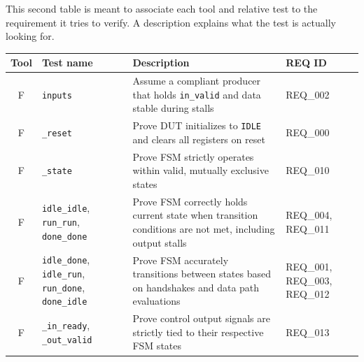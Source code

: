 This second table is meant to associate each tool and relative test to the requirement it tries to verify.
A description explains what the test is actually looking for.
\begin{table}[H]
    \centering
    \begin{tabularx}{\textwidth}{|c|p{3.9cm}|X|p{1.7cm}|}
        \toprule
        \textbf{Tool}   & \textbf{Test name}                                                                & \textbf{Description}                                                                                                      & \textbf{REQ ID}                           \\ \midrule
        F               & \texttt{inputs}                                                                   & Assume a compliant producer that holds \texttt{in\_valid} and data stable during stalls                                   & REQ\_002                                  \\ \midrule
        F               & \texttt{\_reset}                                                                  & Prove DUT initializes to \texttt{IDLE} and clears all registers on reset                                                  & REQ\_000                                  \\ \midrule
        F               & \texttt{\_state}                                                                  & Prove FSM strictly operates within valid, mutually exclusive states                                                       & REQ\_010                                  \\ \midrule
        F               & \texttt{idle\_idle}, \texttt{run\_run}, \texttt{done\_done}                       & Prove FSM correctly holds current state when transition conditions are not met, including output stalls                   & REQ\_004, REQ\_011                        \\ \midrule
        F               & \texttt{idle\_done}, \texttt{idle\_run}, \texttt{run\_done}, \texttt{done\_idle}  & Prove FSM accurately transitions between states based on handshakes and data path evaluations                             & REQ\_001, REQ\_003, REQ\_012              \\ \midrule
        F               & \texttt{\_in\_ready}, \texttt{\_out\_valid}                                       & Prove control output signals are strictly tied to their respective FSM states                                             & REQ\_013                                  \\ \midrule

\end{tabularx}
\end{table}
